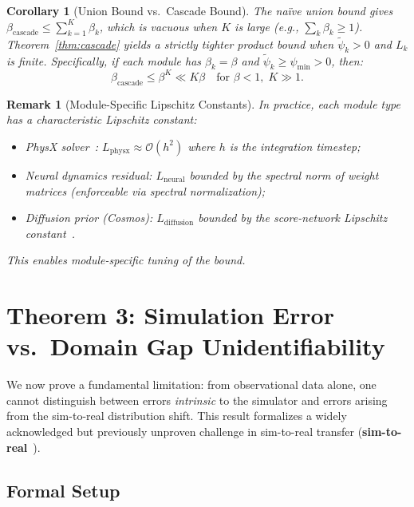 \documentclass[11pt,twocolumn]{article}
\newtheorem{corollary}[theorem]{Corollary}
\newtheorem{remark}[theorem]{Remark}
\theoremstyle{definition}
\begin{document}
\begin{corollary}[Union Bound vs.\ Cascade Bound]
\label{cor:union}
The na\"ive union bound gives $\beta_{\text{cascade}} \le \sum_{k=1}^K
\beta_k$, which is vacuous when $K$ is large (e.g., $\sum_k \beta_k \ge 1$).
Theorem~\ref{thm:cascade} yields a strictly tighter product bound when
$\tilde{\psi}_k > 0$ and $L_k$ is finite.  Specifically, if each module has
$\beta_k = \beta$ and $\tilde{\psi}_k \ge \psi_{\min} > 0$, then:
\begin{equation}
  \beta_{\text{cascade}} \le \beta^K \ll K\beta
  \quad \text{for } \beta < 1,\; K \gg 1.
\end{equation}
\end{corollary}

\begin{remark}[Module-Specific Lipschitz Constants]
In practice, each module type has a characteristic Lipschitz constant:
\begin{itemize}[nosep]
  \item PhysX solver~\cite{physx}: $L_{\text{physx}} \approx \mathcal{O}(h^2)$
    where $h$ is the integration timestep;
  \item Neural dynamics residual: $L_{\text{neural}}$ bounded by the spectral
    norm of weight matrices (enforceable via spectral normalization);
  \item Diffusion prior (Cosmos): $L_{\text{diffusion}}$ bounded by the
    score-network Lipschitz constant~\cite{song2021score}.
\end{itemize}
This enables module-specific tuning of the bound.
\end{remark}

\section{Theorem 3: Simulation Error vs.\ Domain Gap Unidentifiability}
\label{sec:thm3}

We now prove a fundamental limitation: from observational data alone, one
cannot distinguish between errors \emph{intrinsic} to the simulator and errors
arising from the sim-to-real distribution shift.  This result formalizes a
widely acknowledged but previously unproven challenge in sim-to-real transfer
(\textbf{sim-to-real}~).

\subsection{Formal Setup}
\end{document}
